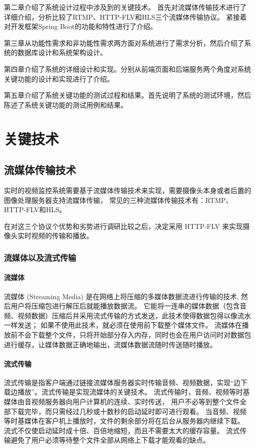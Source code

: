 第二章介绍了系统设计过程中涉及到的关键技术。
首先对流媒体传输技术进行了详细介绍，分析比较了RTMP、HTTP-FLV和HLS三个流媒体传输协议。
紧接着对开发框架Spring Boot的功能和特性进行了介绍。


第三章从功能性需求和非功能性需求两方面对系统进行了需求分析，然后介绍了系统的数据库设计和系统架构设计。

第四章介绍了系统的详细设计和实现。分别从前端页面和后端服务两个角度对系统关键功能的设计和实现进行了介绍。

第五章介绍了系统关键功能的测试过程和结果。首先说明了系统的测试环境，然后陈述了系统关键功能的测试用例和结果。

\chapter{关键技术}
\section{流媒体传输技术}
实时的视频监控系统需要基于流媒体传输技术来实现，需要摄像头本身或者后置的图像处理服务器支持流媒体传输，
常见的三种流媒体传输技术有：RTMP、HTTP-FLV和HLS。

在对这三个协议个优势和劣势进行调研比较之后，决定采用
HTTP-FLV 来实现摄像头实时视频的传输和播放。

\subsection{流媒体以及流式传输}
\subsubsection{流媒体}
流媒体 (Streaming Media) 是在网络上将压缩的多媒体数据流进行传输的技术, 然后用户将压缩包进行解压后就能播放数据流\cite{万梅芬2018基于流媒体技术的数字化校园文化设计与实现}。
它能将一连串的媒体数据（包含音频、视频数据）压缩后并采用流式传输的方式发送，此技术使得数据包得以像流水一样发送；
如果不使用此技术，就必须在使用前下载整个媒体文件。
流媒体在播放前不会下载整个文件，只将开始部分存入内存，同时也会在用户访问时对数据包进行缓存，让媒体数据正确地输出，流媒体数据流随时传送随时播放。

\subsubsection{流式传输}
流式传输是指客户端通过链接流媒体服务器实时传输音频、视频数据，实现“边下载边播放”。流式传输是实现流媒体的关键技术。
流式传输时，音频、视频等时基媒体由音视频服务器向用户计算机的连续、实时传送，
用户不必等到整个文件全部下载完毕，而只需经过几秒或十数秒的启动延时即可进行观看。
当音频、视频等时基媒体在客户机上播放时，文件的剩余部分将在后台从服务器内继续下载。
流式不仅使启动延时成十倍、百倍地缩短，而且不需要太大的缓存容量。
流式传输避免了用户必须等待整个文件全部从网络上下载才能观看的缺点。

